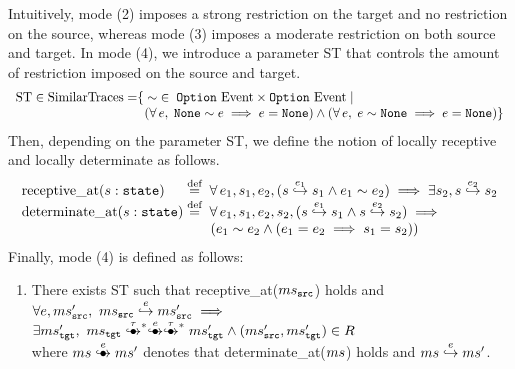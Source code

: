 Intuitively, mode (2) imposes a strong restriction on the target and no restriction on the source, whereas mode (3) imposes a moderate restriction on both source and target.
In mode (4), we introduce a parameter ST that controls the amount of restriction imposed on the source and target.
\[
\begin{array}{l@{}l}
\textrm{ST} \in \textrm{SimilarTraces} = & \{\; \sim \; \in \; \option \Events \times \option \Events \;|\; \\
                         & \;\; (\forall \, e, \; \none \sim e \implies e = \none) \land (\forall \, e, \; e \sim \none \implies e = \none) \}
\end{array}
\]
Then, depending on the parameter ST, we define the notion of locally receptive and locally determinate as follows.
\[
\begin{array}{l@{}l}
\textrm{receptive\_at} (s: \texttt{state})   & \; \defeq \; \forall \, e_1, s_1, e_2, (s \estep{e_1} s_1 \land e_1 \sim e_2) \implies \exists s_2, s \estep{e_2} s_2 \\
\textrm{determinate\_at} (s: \texttt{state}) & \; \defeq \; \forall \, e_1, s_1, e_2, s_2, (s \estep{e_1} s_1 \land s \estep{e_2} s_2) \implies \\
                                             & \;\;\;\;\;\;\; (e_1 \sim e_2 \land (e_1 = e_2 \implies s_1 = s_2)) \\
\end{array}
\]
Finally, mode (4) is defined as follows:
\begin{enumerate}[resume]
\item There exists ST such that receptive\_at($ms{}_{\texttt{src}{}}$) holds and\\
  $\forall e, ms{}_{\texttt{src}{}}',~ ms{}_{\texttt{src}{}} \stackrel{e}{\hookrightarrow} ms{}_{\texttt{src}{}}' \implies {} $ \\
  $ \exists \mstgt',~ \mstgt \exstep{\tau}^{\raisebox{-1mm}{\scriptsize$\ast$}} \exstep{e}\exstep{\tau}^{\raisebox{-1mm}{\scriptsize$\ast$}} \mstgt' \land (\mssrc', \mstgt') \in R$\\
  where $\ms \exstep{e} \ms'$ denotes that determinate\_at($ms$) holds and $ms \stackrel{e}{\hookrightarrow} ms'$.
\end{enumerate}
